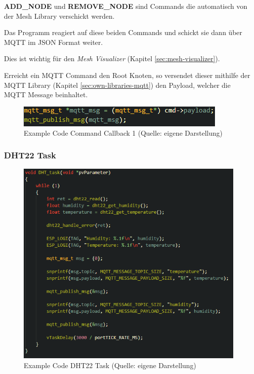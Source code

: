 \textbf{ADD\_NODE} und \textbf{REMOVE\_NODE} sind Commands die automatisch von der Mesh Library verschickt werden.

Das Programm reagiert auf diese beiden Commands und schickt sie dann über MQTT im JSON Format weiter.

Dies ist wichtig für den \textit{Mesh Visualizer} (Kapitel \ref{sec:mesh-visualizer}).

Erreicht ein MQTT Command den Root Knoten, so versendet dieser mithilfe der MQTT Library (Kapitel \ref{sec:own-libraries-mqtt}) den Payload, welcher die MQTT Message beinhaltet.

\begin{figure}[H]
    \begin{center}
        \includegraphics[scale=0.8]{images/example_code_on_cmd_one.png}
        \caption{Example Code Command Callback 1 (Quelle: eigene Darstellung)}
        \label{abb:example_code_on_cmd_one}
    \end{center}
\end{figure}

\subsubsection{DHT22 Task}

\begin{figure}[H]
    \begin{center}
        \includegraphics[scale=0.8]{images/example_code_dht22_task.png}
        \caption{Example Code DHT22 Task (Quelle: eigene Darstellung)}
        \label{abb:example_code_dht22_task}
    \end{center}
\end{figure}

